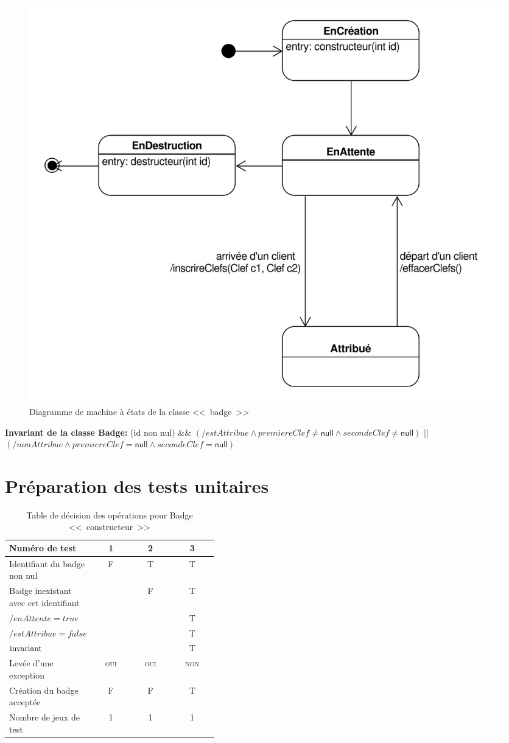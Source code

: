 \documentclass[11pt,article]{article}
\newcommand{\nullvalue}{\textsf{null}\xspace}
\newcommand{\invariant}{\ensuremath\mathrm{invariant}}
\begin{document}
\begin{figure}[h!]
\begin{center}
\includegraphics[scale=0.5]{DiagrammesDeMachineAEtats/gestionclefshotel_uml_diag_machine_a_etats_badge}
\caption{Diagramme de machine à états de la classe <<~badge~>>}
\end{center}
\label{umlet_diag_classes}
\end{figure}

\textbf{Invariant de la classe Badge:} (id non nul) \&\& $(/estAttribue \land premiereClef \neq \nullvalue \land secondeClef \neq \nullvalue)$  || $(/nonAttribue \land premiereClef = \nullvalue \land secondeClef = \nullvalue)$

\newpage

\section{Préparation des tests unitaires}

\begin{table}[!ht]
\begin{center}
\begin{tabular}{|p{0.4\linewidth}|c|c|c|}
\hline
Numéro de test
&1&2&3\\
\hline
\hline
Identifiant du badge non nul
&F&T&T\\
\hline
Badge inexistant avec cet identifiant
& &F&T\\
\hline
\hline
$/enAttente = true$
& & &T\\
\hline
$/estAttribue = false$
& & &T\\
\hline
$\invariant$
& & &T\\
\hline
Levée d'une exception&\textsc{oui}&\textsc{oui}&\textsc{non}\\
\hline
\hline
Création du badge acceptée
&F&F&T\\
\hline
\hline
Nombre de jeux de test
&1&1&1\\
\hline
\end{tabular}
\end{center}
\caption{Table de décision des opérations pour Badge <<~constructeur~>>}
\end{table}
\end{document}
